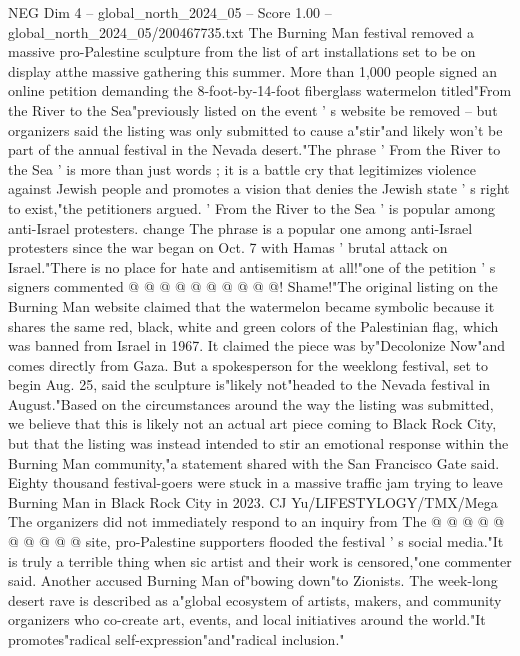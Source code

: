 \begin{textsample}{NEG Dim 4 – global\_north\_2024\_05 – Score 1.00 – global\_north\_2024\_05/200467735.txt}  \label{ex:f4_neg_115}
The Burning Man festival removed a massive pro-Palestine sculpture from the list of art installations set to be on display atthe massive gathering this summer.
More than 1,000 people signed an online petition demanding the 8-foot-by-14-foot fiberglass watermelon titled"From the River to the Sea"previously listed on the event ' s website be removed -- but organizers said the listing was only submitted to cause a"stir"and likely won't be part of the annual festival in the Nevada desert."The phrase ' From the River to the Sea ' is more than just words ; it is a battle cry that legitimizes violence against Jewish people and promotes a vision that denies the Jewish state ' s right to exist,"the petitioners argued. ' From the River to the Sea ' is popular among anti-Israel protesters. change The phrase is a popular one among anti-Israel protesters since the war began on Oct. 7 with Hamas ' brutal attack on Israel."There is no place for hate and antisemitism at all!"one of the petition ' s signers commented @ @ @ @ @ @ @ @ @ @!
Shame!"The original listing on the Burning Man website claimed that the watermelon became symbolic because it shares the same red, black, white and green colors of the Palestinian flag, which was banned from Israel in 1967.
It claimed the piece was by"Decolonize Now"and comes directly from Gaza.
But a spokesperson for the weeklong festival, set to begin Aug. 25, said the sculpture is"likely not"headed to the Nevada festival in August."Based on the circumstances around the way the listing was submitted, we believe that this is likely not an actual art piece coming to Black Rock City, but that the listing was instead intended to stir an emotional response within the Burning Man community,"a statement shared with the San Francisco Gate said.
Eighty thousand festival-goers were stuck in a massive traffic jam trying to leave Burning Man in Black Rock City in 2023.
CJ Yu/LIFESTYLOGY/TMX/Mega The organizers did not immediately respond to an inquiry from The @ @ @ @ @ @ @ @ @ @ site, pro-Palestine supporters flooded the festival ' s social media."It is truly a terrible thing when sic artist and their work is censored,"one commenter said.
Another accused Burning Man of"bowing down"to Zionists.
The week-long desert rave is described as a"global ecosystem of artists, makers, and community organizers who co-create art, events, and local initiatives around the world."It promotes"radical self-expression"and"radical inclusion."

\end{textsample}
